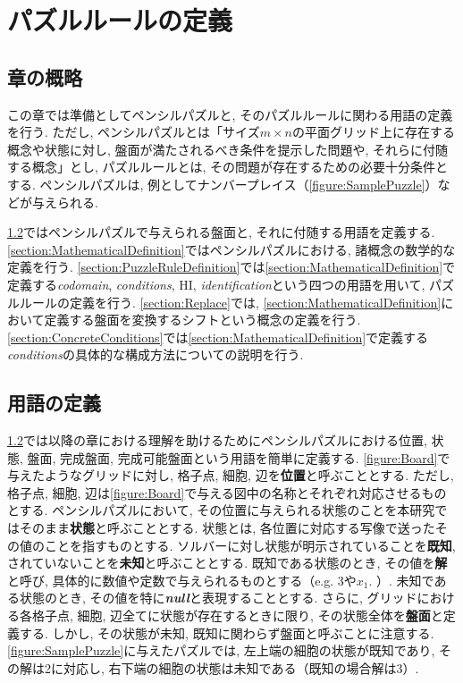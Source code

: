 \chapter{パズルルールの定義}\label{chapter:Prepare}
\section{章の概略}\label{section:Outline}
この章では準備としてペンシルパズルと, そのパズルルールに関わる用語の定義を行う. ただし, ペンシルパズルとは「サイズ$m\times n$の平面グリッド上に存在する概念や状態に対し, 盤面が満たされるべき条件を提示した問題や, それらに付随する概念」とし, パズルルールとは, その問題が存在するための必要十分条件とする.
ペンシルパズルは, 例としてナンバープレイス（\cref{figure:SamplePuzzle}）などが与えられる.

\cref{section:WordDefinition}ではペンシルパズルで与えられる盤面と, それに付随する用語を定義する.
\cref{section:MathematicalDefinition}ではペンシルパズルにおける, 諸概念の数学的な定義を行う.
\cref{section:PuzzleRuleDefinition}では\cref{section:MathematicalDefinition}で定義する\textit{codomain}, \textit{conditions}, HI, \textit{identification}という四つの用語を用いて, パズルルールの定義を行う.
\cref{section:Replace}では, \cref{section:MathematicalDefinition}において定義する盤面を変換するシフトという概念の定義を行う.
\cref{section:ConcreteConditions}では\cref{section:MathematicalDefinition}で定義する\textit{conditions}の具体的な構成方法についての説明を行う.

\section{用語の定義}\label{section:WordDefinition}
\cref{section:WordDefinition}では以降の章における理解を助けるためにペンシルパズルにおける位置, 状態, 盤面, 完成盤面, 完成可能盤面という用語を簡単に定義する. \cref{figure:Board}で与えたようなグリッドに対し, 格子点, 細胞, 辺を\textbf{位置}と呼ぶこととする. ただし, 格子点, 細胞, 辺は\cref{figure:Board}で与える図中の名称とそれぞれ対応させるものとする. ペンシルパズルにおいて, その位置に与えられる状態のことを本研究ではそのまま\textbf{状態}と呼ぶこととする. 状態とは, 各位置に対応する写像で送ったその値のことを指すものとする. ソルバーに対し状態が明示されていることを\textbf{既知}, されていないことを\textbf{未知}と呼ぶこととする. 既知である状態のとき, その値を\textbf{解}と呼び, 具体的に数値や定数で与えられるものとする（e.g. 3や$x_1$. ）. 未知である状態のとき, その値を特に\textbf{\textit{null}}と表現することとする. さらに, グリッドにおける各格子点, 細胞, 辺全てに状態が存在するときに限り, その状態全体を\textbf{盤面}と定義する. しかし, その状態が未知, 既知に関わらず盤面と呼ぶことに注意する. \cref{figure:SamplePuzzle}に与えたパズルでは, 左上端の細胞の状態が既知であり, その解は2に対応し, 右下端の細胞の状態は未知である（既知の場合解は3）.

